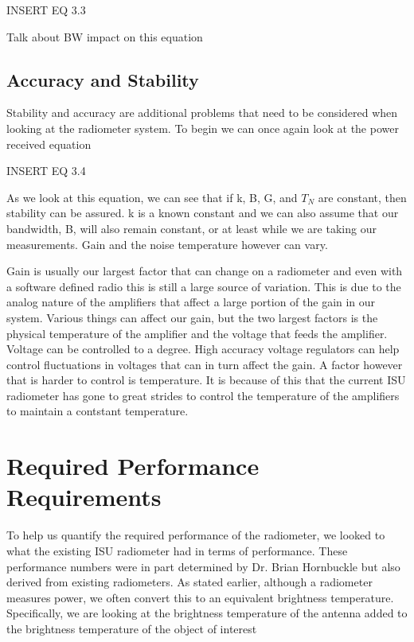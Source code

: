 INSERT EQ 3.3

Talk about BW impact on this equation

\subsection{Accuracy and Stability}
Stability and accuracy are additional problems that need to be considered when looking at the radiometer system.  To begin we can once again look at the power received equation

INSERT EQ 3.4

As we look at this equation, we can see that if k, B, G, and $T_{N}$ are constant, then stability can be assured.  k is a known constant and we can also assume that our bandwidth, B, will also remain constant, or at least while we are taking our measurements.  Gain and the noise temperature however can vary.  

Gain is usually our largest factor that can change on a radiometer and even with a software defined radio this is still a large source of variation.  This is due to the analog nature of the amplifiers that affect a large portion of the gain in our system.  Various things can affect our gain, but the two largest factors is the physical temperature of the amplifier and the voltage that feeds the amplifier.  Voltage can be controlled to a degree.  High accuracy voltage regulators can help control fluctuations in voltages that can in turn affect the gain.  A factor however that is harder to control is temperature.  It is because of this that the current ISU radiometer has gone to great strides to control the temperature of the amplifiers to maintain a contstant temperature.


\section{Required Performance Requirements}

To help us quantify the required performance of the radiometer, we looked to what the existing ISU radiometer had in terms of performance.  These performance numbers were in part determined by Dr. Brian Hornbuckle but also derived from existing radiometers.  As stated earlier, although a radiometer measures power, we often convert this to an equivalent brightness temperature.  Specifically, we are looking at the brightness temperature of the antenna added to the brightness temperature of the object of interest



